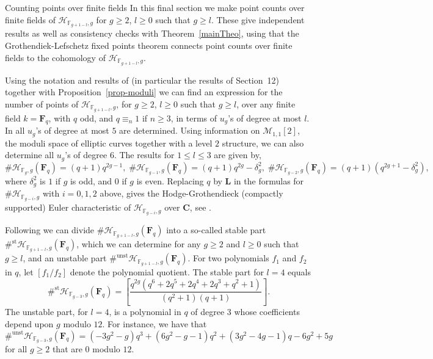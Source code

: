 \documentclass[10pt,a4paper,twoside]{amsart}
\theoremstyle{plain}
\theoremstyle{definition}
\theoremstyle{remark}
\begin{document}
\begin{subsection}{Counting points over finite fields} \label{sec-lefschetz}
In this final section we make point counts over finite fields of $\mathcal{H}_{\mathbb{F}_{g+1-l},g}$ for $g \geq 2$, $l \geq 0$ such that $g \geq l$. These give independent results as well as consistency checks with Theorem~\ref{mainTheo}, using that the Grothendiek-Lefschetz fixed points theorem connects point counts over finite fields to the cohomology of $\mathcal{H}_{\mathbb{F}_{g+1-l},g}$. 

Using the notation and results of \cite{Bhyp} (in particular the results of Section~12)  together with Proposition~\ref{prop-moduli} we can find an expression for the number of points of $\mathcal{H}_{\mathbb{F}_{g+1-l},g}$, for $g \geq 2$, $l \geq 0$ such that $g \geq l$, over any finite field $k=\mathbf F_q$, with $q$ odd, and $q \equiv_n 1$ if $n\geq 3$, in terms of $u_g$'s of degree at most $l$. In \cite[Section 7]{Bhyp} all $u_g$'s of degree at most $5$ are determined. Using information on $\mathcal M_{1,1}[2]$, the moduli space of elliptic curves together with a level $2$ structure, we can also determine all $u_g$'s of degree $6$. The results for $1 \leq l \leq 3$ are given by, 
\[
\# \mathcal{H}_{\mathbb{F}_{g},g}(\mathbf F_q)=(q+1)q^{2g-1}, \;
\# \mathcal{H}_{\mathbb{F}_{g-1},g}(\mathbf F_q)=(q+1)q^{2g}-\delta^2_g, \;
\# \mathcal{H}_{\mathbb{F}_{g-2},g}(\mathbf F_q)=(q+1)(q^{2g+1}-\delta^2_g),
\]
where $\delta^2_g$ is $1$ if $g$ is odd, and $0$ if $g$ is even. Replacing $q$ by $\mathbf L$ in the formulas for $\# \mathcal{H}_{\mathbb{F}_{g-i},g}$ with $i=0,1,2$ above, gives the Hodge-Grothendieck (compactly supported) Euler characteristic of $\mathcal{H}_{\mathbb{F}_{g-i},g}$ over $\mathbf C$, see \cite[Theorem 2.1.8]{HRV}. 

Following \cite[Section 13]{Bhyp} we can divide $\# \mathcal{H}_{\mathbb{F}_{g+1-l},g}(\mathbf F_q)$ into a so-called stable part $\#^{\mathrm{st}} \mathcal{H}_{\mathbb{F}_{g+1-l},g}(\mathbf F_q)$, which we can determine for any $g \geq 2$ and $l \geq 0$ such that $g \geq l$, and an unstable part $\#^{\mathrm{unst}} \mathcal{H}_{\mathbb{F}_{g+1-l},g}(\mathbf F_q)$. 
For two polynomials $f_1$ and $f_2$ in $q$, let $[f_1/f_2]$ denote the polynomial quotient. The stable part for $l=4$ equals 
\[
\#^{\mathrm{st}} \mathcal{H}_{\mathbb{F}_{g-3},g}(\mathbf F_q)= \left[\frac{q^{2g}(q^6+2q^5+2q^4+2q^3+q^2+1)}{(q^2+1)(q+1)} \right]. 
\]
The unstable part, for $l=4$, is a polynomial in $q$ of degree $3$ whose coefficients depend upon $g$ modulo $12$. For instance, we have that  
\[
\#^{\mathrm{unst}} \mathcal{H}_{\mathbb{F}_{g-3},g}(\mathbf F_q)=(-3g^2-g)q^3+(6g^2-g-1)q^2+(3g^2-4g-1)q-6g^2+5g
\]
for all $g \geq 2$ that are $0$ modulo $12$. 


\end{subsection}
\end{document}

